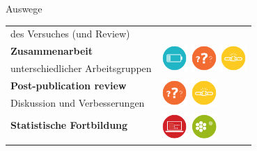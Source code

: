 \documentclass{beamer}
\begin{document}
\begin{frame}{Auswege}
\begin{tabular}{>{\raggedright}p{5.5cm}l}
        des Versuches (und Review) & \\[1em]
        \textbf{Zusammenarbeit} & \multirow{2}{*}{%
            \includegraphics[width=1cm]{underpowered_study}
            \includegraphics[width=1cm]{underspecified_method}
            \includegraphics[width=1cm]{weak_experimental_design}} \\
        unterschiedlicher Arbeitsgruppen & \\[1em]
        \textbf{Post-publication review} & \multirow{2}{*}{%
            \includegraphics[width=1cm]{underspecified_method}
            \includegraphics[width=1cm]{weak_experimental_design}} \\
        Diskussion und Verbesserungen & \\[1em]
        \textbf{Statistische Fortbildung} & \multirow{2}{*}{%
            \includegraphics[width=1cm]{data_dredging}
            \includegraphics[width=1cm]{omitting_null_results}} \\
        & \\
    \end{tabular}

\end{frame}
\end{document}
